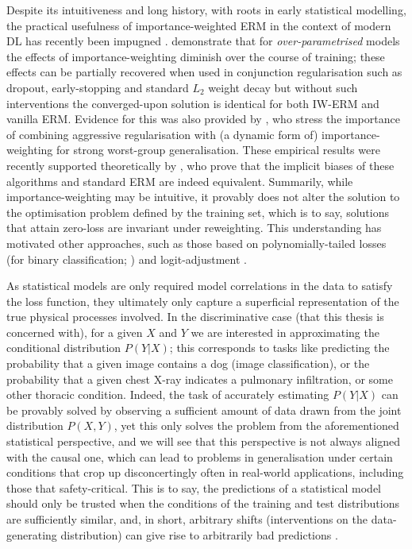 Despite its intuitiveness and long history, with roots in early statistical modelling, the
practical usefulness of importance-weighted \ac{ERM} in the context of modern \acf{DL} has recently
been impugned \citep{byrd2019effect, zhai2022understanding}.
%
\cite{byrd2019effect} demonstrate that for \emph{over-parametrised} models the effects of
importance-weighting diminish over the course of training; these effects can be partially recovered
when used in conjunction regularisation such as dropout, early-stopping and standard \(L_2\) weight
decay but without such interventions the converged-upon solution is identical for both
\ac{IW}-\ac{ERM} and
vanilla \ac{ERM}. 
%
Evidence for this was also provided by \cite{sagawa2019distributionally}, who stress the importance
of combining aggressive regularisation with (a dynamic form of) importance-weighting for strong
worst-group generalisation.
%
These empirical results were recently supported theoretically by \cite{zhai2022understanding}, who
prove that the implicit biases of these algorithms and standard \ac{ERM} are indeed equivalent.
%
Summarily, while importance-weighting may be intuitive, it provably does not alter the solution to
the optimisation problem defined by the training set, which is to say, solutions that attain
zero-loss are invariant under reweighting.
%
This understanding has motivated other approaches, such as those based on polynomially-tailed
losses (for binary classification; \cite{wang2021importance}) and logit-adjustment
\citep{menon2020long}.
%

As statistical models are only required model correlations in the data to satisfy the loss
function, they ultimately only capture a superficial representation of the true physical processes
involved.
%
In the discriminative case (that this thesis is concerned with), for a given \( X \) and \( Y \) we
are interested in approximating the conditional distribution \( P(Y|X) \); this  corresponds to
tasks like predicting the probability that a given image contains a dog (image classification), or
the probability that a given chest X-ray indicates a pulmonary infiltration, or some other thoracic
condition.
%
Indeed, the task of accurately estimating \( P(Y | X) \) can be provably solved by observing a
sufficient amount of \iid{} data drawn from the joint distribution \( P(X,Y) \), yet this only
solves the problem from the aforementioned statistical perspective, and we will see that this
perspective is not always aligned with the causal one, which can lead to problems in generalisation
under certain conditions that crop up disconcertingly often in real-world applications, including
those that safety-critical.
%
This is to say, the predictions of a statistical model should only be trusted when the conditions
of the training and test distributions are sufficiently similar, and, in short, arbitrary shifts
(interventions on the data-generating distribution) can give rise to arbitrarily bad predictions
\citep{pearl2009causality, scholkopf2012causal}.

